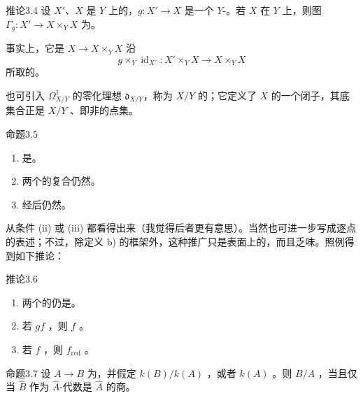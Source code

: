 \begin{SGAresult}{推论}{3.4}
设 $X'$、$X$ 是 $Y$ 上的，$g\colon X'\to X$ 是一个 $Y$-。若 $X$ 在 $Y$ 上，则图 $\Gamma_g\colon X'\to X\times_Y X$ 为。
\end{SGAresult}
事实上，它是 $X\to X\times_Y X$ 沿
\[
 g\times_Y\operatorname{id}_{X'}\colon X'\times_Y X\longrightarrow X\times_Y X
\]
所取的。

也可引入 $\Omega^1_{X/Y}$ 的零化理想 $\mathfrak d_{X/Y}$，称为 $X/Y$ 的；它定义了 $X$ 的一个闭子，其底集合正是 $X/Y$ 、即非的点集。
\begin{SGAresult}{命题}{3.5}
\begin{enumerate}
\item[(i)] 是。
\item[(ii)] 两个的复合仍然。
\item[(iii)] 经后仍然。
\end{enumerate}
\end{SGAresult}
从条件 (ii) 或 (iii) 都看得出来（我觉得后者更有意思）。当然也可进一步写成逐点的表述；不过，除定义 b) 的框架外，这种推广只是表面上的，而且乏味。照例得到如下推论：
\begin{SGAresult}{推论}{3.6}
\begin{enumerate}
\item[(iv)] 两个的仍是。
\item[(v)] 若 $gf$ ，则 $f$ 。
\item[(vi)] 若 $f$ ，则 $f_{\mathrm{red}}$ 。
\end{enumerate}
\end{SGAresult}
\begin{SGAresult}{命题}{3.7}
设 $A\to B$ 为，并假定 $k(B)/k(A)$ ，或者 $k(A)$ 。则 $B/A$ ，当且仅当 $\widehat B$ 作为 $\widehat A$-代数是 $\widehat A$ 的商。
\end{SGAresult}
